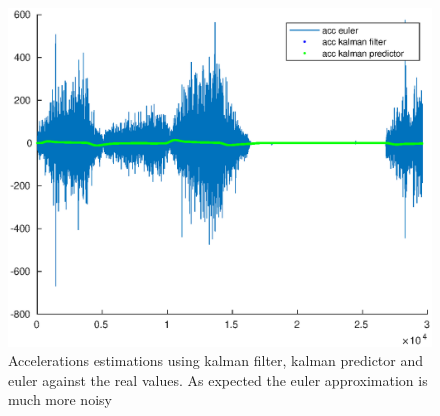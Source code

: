 \documentclass[a4paper,12pt]{article}
\begin{document}
\begin{figure}[H]
    \begin{center}
        \includegraphics[scale=1.0]{images/acc.eps}
    \end{center}
    \caption{Accelerations estimations using kalman filter, kalman predictor and euler against the real values. As expected the euler approximation is much more noisy}
    \label{fig:hw3_acc}
\end{figure}
\end{document}
